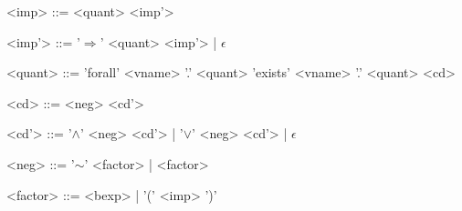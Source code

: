 \begin{grammar}
<imp> ::= <quant> <imp'>

<imp'> ::= '$\Rightarrow$' <quant> <imp'> | $\epsilon$

<quant> ::= 'forall' <vname> '.' <quant>
\alt 'exists' <vname> '.' <quant>
\alt <cd>

<cd> ::= <neg> <cd'>

<cd'> ::= '$\wedge$' <neg> <cd'> | '$\vee$' <neg> <cd'> | $\epsilon$

<neg> ::= '$\sim$' <factor> | <factor>

<factor> ::=  <bexp> | '(' <imp> ')'
\end{grammar}

